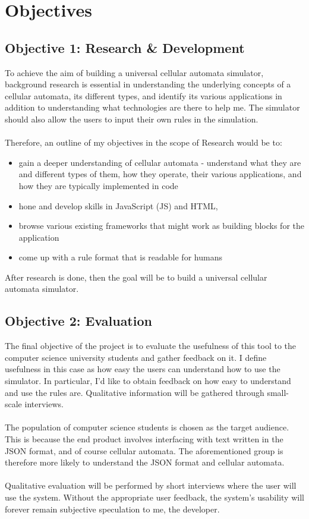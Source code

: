 \section{Objectives}
\subsection{Objective 1: Research \& Development}
To achieve the aim of building a universal cellular automata simulator, background research is essential in understanding the underlying concepts of a cellular automata, its different types, and identify its various applications in addition to understanding what technologies are there to help me. The simulator should also allow the users to input their own rules in the simulation.
\\ \\
Therefore, an outline of my objectives in the scope of Research would be to:
\begin{itemize}
    \item gain a deeper understanding of cellular automata - understand what they are and different types of them, how they operate, their various applications, and how they are typically implemented in code
    \item hone and develop skills in JavaScript (JS) and HTML,
    \item browse various existing frameworks that might work as building blocks for the application
    \item come up with a rule format that is readable for humans
\end{itemize}
After research is done, then the goal will be to build a universal cellular automata simulator.
\subsection{Objective 2: Evaluation}
The final objective of the project is to evaluate the usefulness of this tool to the computer science university students and gather feedback on it. I define usefulness in this case as how easy the users can understand how to use the simulator. In particular, I'd like to obtain feedback on how easy to understand and use the rules are. Qualitative information will be gathered through small-scale interviews. 
\\ \\
The population of computer science students is chosen as the target audience. This is because the end product involves interfacing with text written in the JSON format, and of course cellular automata. The aforementioned group is therefore more likely to understand the JSON format and cellular automata.
\\ \\
Qualitative evaluation will be performed by short interviews where the user will use the system. Without the appropriate user feedback, the system's usability will forever remain subjective speculation to me, the developer. 